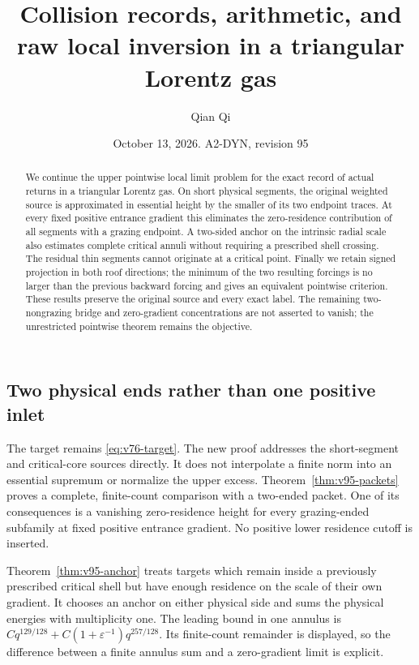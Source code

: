 \documentclass[11pt,reqno]{amsart}
\title[Collision records and raw local inversion]{Collision records, arithmetic, and raw local inversion in a triangular Lorentz gas}
\author{Qian Qi}
\date{October 13, 2026. A2-DYN, revision 95}
\numberwithin{equation}{section}
\theoremstyle{definition}
\theoremstyle{remark}\newtheorem{remark}[theorem]{Remark}
\begin{document}
\raggedbottom
\begin{abstract}
We continue the upper pointwise local limit problem for the exact record
of actual returns in a triangular Lorentz gas. On short physical segments,
the original weighted source is approximated in essential height by the
smaller of its two endpoint traces. At every fixed positive entrance
gradient this eliminates the zero-residence contribution of all segments
with a grazing endpoint. A two-sided anchor on the intrinsic radial scale
also estimates complete critical annuli without requiring a prescribed
shell crossing. The residual thin segments cannot originate at a critical
point. Finally we retain signed projection in both roof directions; the
minimum of the two resulting forcings is no larger than the previous
backward forcing and gives an equivalent pointwise criterion. These
results preserve the original source and every exact label. The remaining
two-nongrazing bridge and zero-gradient concentrations are not asserted
to vanish; the unrestricted pointwise theorem remains the objective.
\end{abstract}
\maketitle


\subsection{Two physical ends rather than one positive inlet}
The target remains \eqref{eq:v76-target}. The new proof addresses the
short-segment and critical-core sources directly. It does not interpolate
a finite norm into an essential supremum or normalize the upper excess.
Theorem~\ref{thm:v95-packets} proves a complete, finite-count comparison
with a two-ended packet. One of its consequences is a vanishing
zero-residence height for every grazing-ended subfamily at fixed positive
entrance gradient. No positive lower residence cutoff is inserted.

Theorem~\ref{thm:v95-anchor} treats targets which remain inside a
previously prescribed critical shell but have enough residence on the
scale of their own gradient. It chooses an anchor on either physical
side and sums the physical energies with multiplicity one. The leading
bound in one annulus is $Cq^{129/128}+C(1+\varepsilon^{-1})q^{257/128}$.
Its finite-count remainder is displayed, so the difference between a
finite annulus sum and a zero-gradient limit is explicit.
\end{document}
